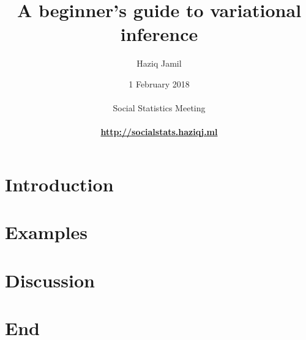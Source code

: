 \documentclass[]{beamer}
\begin{document}

\title[Variational inference]{A beginner's guide to variational inference}
\author[Haziq Jamil]{
  \large{Haziq Jamil}\\ 
}
\date[1 Feb 2018]{
  1 February 2018\\
  \hspace{1cm}\\
  Social Statistics Meeting\\
  \hspace{1cm}\\
  \href{http://socialstats.haziqj.ml}{\color{fu-red!60} \textbf{http://socialstats.haziqj.ml}}
}

\mytitle


\mytoc


\section{Introduction}


\section[Examples]{Examples}
\transition


\section{Discussion}
\transition


\section*{End}
\end{document}

